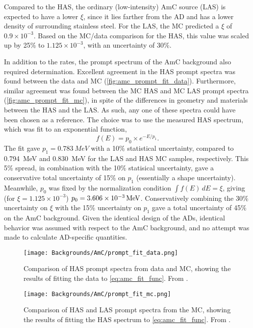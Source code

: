 \documentclass[../thesis.tex]{subfiles}
\begin{document}
Compared to the HAS, the ordinary (low-intensity) AmC source (LAS) is expected to have a lower $\xi$, since it lies farther from the AD and has a lower density of surrounding stainless steel. For the LAS, the MC predicted a $\xi$ of $0.9\times10^{-3}$. Based on the MC/data comparison for the HAS, this value was scaled up by 25\% to $1.125\times10^{-3}$, with an uncertainty of 30\%. 

In addition to the rates, the prompt spectrum of the AmC background also required determination. Excellent agreement in the HAS prompt spectra was found between the data and MC (\autoref{fig:amc_prompt_fit_data}). Furthermore, similar agreement was found between the MC HAS and MC LAS prompt spectra (\autoref{fig:amc_prompt_fit_mc}), in spite of the differences in geometry and materials between the HAS and the LAS. As such, any one of these spectra could have been chosen as a reference. The choice was to use the measured HAS spectrum, which was fit to an exponential function,
\begin{equation}
  f(E) = p_0 \times e^{-E/p_1}.
  \label{eq:amc_fit_func}
\end{equation}
The fit gave $p_1 = \SI{0.783}{MeV}$ with a 10\% statistical uncertainty, compared to \SI{0.794}{MeV} and \SI{0.830}{MeV} for the LAS and HAS MC samples, respectively. This 5\% spread, in combination with the 10\% statisical uncertainty, gave a conservative total uncertainty of 15\% on $p_1$ (essentially a shape uncertainty). Meanwhile, $p_0$ was fixed by the normalization condition $\int f(E)\,dE = \xi$, giving (for $\xi = 1.125\times10^{-3}$) $p_0 = \SI[parse-numbers = false]{3.606\times10^{-3}}{/MeV}$. Conservatively combining the 30\% uncertainty on $\xi$ with the 15\% uncertainty on $p_1$ gave a total uncertainty of 45\% on the AmC background. Given the identical design of the ADs, identical behavior was assumed with respect to the AmC background, and no attempt was made to calculate AD-specific quantities.

\begin{figure}[ht]
  \texttt{[image: Backgrounds/AmC/prompt\_fit\_data.png]}
  \caption{Comparison of HAS prompt spectra from data and MC, showing the results of fitting the data to \autoref{eq:amc_fit_func}. From \cite{Gu_2016}.}
  \label{fig:amc_prompt_fit_data}
\end{figure}

\begin{figure}[ht]
  \texttt{[image: Backgrounds/AmC/prompt\_fit\_mc.png]}
  \caption{Comparison of HAS and LAS prompt spectra from the MC, showing the results of fitting the HAS spectrum to \autoref{eq:amc_fit_func}. From \cite{Gu_2016}.}
  \label{fig:amc_prompt_fit_mc}
\end{figure}
\end{document}
